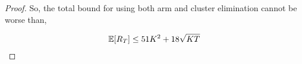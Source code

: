 \begin{proof}
	So, the total bound for using both arm and cluster elimination cannot be worse than,
	
	\begin{align*}
	\mathbb{E}[R_{T}]\leq 51 K^2 + 18\sqrt{KT}
	\end{align*}		
\end{proof}